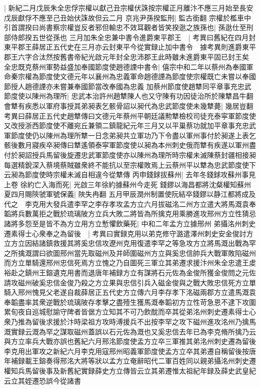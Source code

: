 |{
	新紀二月戊辰朱全忠俘宗權以獻己丑宗權伏誅按宗權正月離汴不應三月始至長安戊辰獻俘不應至己丑始伏誅故但云二月}
京兆尹孫揆監刑|{
	監古銜翻}
宗權於檻車中引首謂揆曰尚書察宗權豈反者邪但輸忠不效耳觀者皆笑揆逖之族孫也|{
	孫逖仕至刑部侍郎揆五世從孫也}
三月加朱全忠兼中書令進爵東平郡王　|{
	考異曰舊紀在四月封東平郡王薛居正五代史在三月亦云封東平今從實録止加中書令　據考異則進爵東平郡王六字合汰然按舊書帝紀光啟元年封全忠沛郡王此時雖未進爵東平固已封王矣}
全忠既克蔡州軍勢益盛加奉國節度使趙德諲中書令|{
	僖宗中和二年以蔡州為奉國軍命秦宗權為節度使文德元年以襄州為忠義軍命趙德諲為節度使宗權既亡未嘗以奉國節授人趙德諲亦未嘗兼奉國節當改奉國為忠義}
加蔡州節度使趙犨同平章事充忠武節度使以陳州為理所|{
	忠武本治許州趙犨陳人也又守陳有功因徒治所於陳犨昌牛翻}
會犨有疾悉以軍府事授其弟昶表乞骸骨詔以昶代為忠武節度使未幾犨薨|{
	幾居豈翻　考異曰薛居正五代史趙犨傳曰文德元年蔡州平朝廷議勲犨檢校司徒充泰寜軍節度使又改授浙西節度使不離宛丘兼領二鎮龍紀元年三月又以平巢蔡功就加平章事充忠武軍節度使仍以陳州為理所犨一日念弟昶共立軍功乃下令盡以軍州事付於昶遂上表乞骸後數月寢疾卒昶傳曰犨遙領泰寜軍節度使以昶為本州刺史俄而犨有疾遂以軍州盡付於昶詔授兵馬留後旋遷忠武軍節度使亦以陳州為理所時宗權未滅陳蔡封疆相接昶每選精銳深入蔡境蔡賊雖衆終不能抗以至宗權敗焉上云蔡州平以犨為忠武節度使下云昶為節度使時宗權未滅自相違今從犨傳}
丙申錢銶拔蘇州|{
	去年冬錢銶攻蘇州事見上卷}
徐約亡入海而死|{
	光啟三年徐約據蘇州今走死}
錢鏐以海昌都將沈粲權知蘇州　夏四月賜陝虢軍號保義|{
	陜失冉翻}
五月甲辰潤州制置使阮結卒錢鏐以静江都將成及代之　李克用大發兵遣李罕之李存孝攻孟方立六月拔磁洺二州方立遣大將馬溉袁奉韜將兵數萬拒之戰於琉璃陂方立兵大敗二將皆為所擒克用乘勝進攻邢州方立性猜忌諸將多怨至是皆不為方立用方立慙懼飲藥死|{
	中和二年孟方立據邢州}
弟攝洺州刺史遷素得士心衆奉之為留後　|{
	考異曰實録克用以弟克修守潞遣澤州刺史安金俊討方立方立因結諸鎮救援其將奚忠信攻遼州克用復遣李罕之等急攻方立將馬溉出戰為罕之所擒溉謂曰欲圖邢州當先取磁州及并師圍磁州方立與奚忠信帥兵大戰軍敗陷磁州而方立單騎還邢州忠信死焉方立愧之乃自圖死三軍立其弟遷求援汴州朱全忠遣王䖍裕赴之鎮州王鎔遺克用書而退唐年補録方立有謀將石元佐為金俊所獲金俊問之元佐請攻磁州破奚忠信金俊乃殺之方立果與忠信引兵入磁金俊與之戰大敗忠信死方立單騎入邢州愧見父老遂自裁薛居正五代史方立傳六月李存孝下洺磁兩郡方立遣馬溉袁奉韜盡率其衆逆戰於琉璃陂存孝擊之盡殪生獲馬溉奉韜初方立性苛急恩不逮下攻圍累旬夜自巡城慰諭守陴者皆倨方立知其不可乃飲酖而卒其從弟洺州刺史遷素得士心衆乃推為留後求援於汴時梁祖方攻時溥援兵不出按李罕之攻下磁州進攻洺州乃擒馬溉實録云溉為罕之謀取磁州蓋誤以石元佐為溉也又奚忠信去年已為李克脩所擒乃云與方立率兵大戰亦誤也舊紀六月邢洺節度使孟方立卒三軍推其弟洺州刺史遷為留後李克用出軍攻之新紀六月李克用寇邢州昭義軍節度使孟方立卒其弟遷自稱留後按唐年補録載王鎔奏得邢洺大將等狀以孟方立奄辭昭代二軍百姓同以親弟攝洺州刺史遷權知兵馬留後事及新舊紀實録薛史方立傳皆云立其弟遷惟太祖紀年録及薛史武皇紀云立其姪遷恐誤今從諸書}
